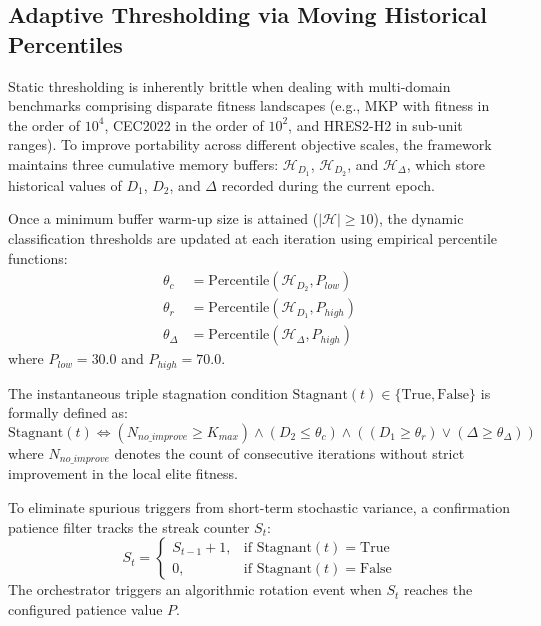 \documentclass[review]{elsarticle}
\begin{document}
\subsection{Adaptive Thresholding via Moving Historical Percentiles}
\label{sec:adaptive_thresholding}

Static thresholding is inherently brittle when dealing with multi-domain benchmarks comprising disparate fitness landscapes (e.g., MKP with fitness in the order of $10^4$, CEC2022 in the order of $10^2$, and HRES2-H2 in sub-unit ranges). To improve portability across different objective scales, the framework maintains three cumulative memory buffers: $\mathcal{H}_{D_1}$, $\mathcal{H}_{D_2}$, and $\mathcal{H}_{\Delta}$, which store historical values of $D_1$, $D_2$, and $\Delta$ recorded during the current epoch.

Once a minimum buffer warm-up size is attained ($|\mathcal{H}| \ge 10$), the dynamic classification thresholds are updated at each iteration using empirical percentile functions:
\begin{align}
\theta_c &= \text{Percentile}\left(\mathcal{H}_{D_2}, P_{low}\right) \label{eq:theta_c} \\
\theta_r &= \text{Percentile}\left(\mathcal{H}_{D_1}, P_{high}\right) \label{eq:theta_r} \\
\theta_\Delta &= \text{Percentile}\left(\mathcal{H}_{\Delta}, P_{high}\right) \label{eq:theta_delta}
\end{align}
where $P_{low} = 30.0$ and $P_{high} = 70.0$.

The instantaneous triple stagnation condition $\text{Stagnant}(t) \in \{\text{True}, \text{False}\}$ is formally defined as:
\begin{equation}
\text{Stagnant}(t) \iff \left( N_{no\_improve} \ge K_{max} \right) \land \left( D_2 \le \theta_c \right) \land \left( (D_1 \ge \theta_r) \lor (\Delta \ge \theta_\Delta) \right)
\label{eq:stagnant_condition}
\end{equation}
where $N_{no\_improve}$ denotes the count of consecutive iterations without strict improvement in the local elite fitness.

To eliminate spurious triggers from short-term stochastic variance, a confirmation patience filter tracks the streak counter $S_t$:
\begin{equation}
S_t = \begin{cases}
S_{t-1} + 1, & \text{if } \text{Stagnant}(t) = \text{True} \\
0, & \text{if } \text{Stagnant}(t) = \text{False}
\end{cases}
\label{eq:streak_counter}
\end{equation}
The orchestrator triggers an algorithmic rotation event when $S_t$ reaches the configured patience value $P$.
\end{document}
